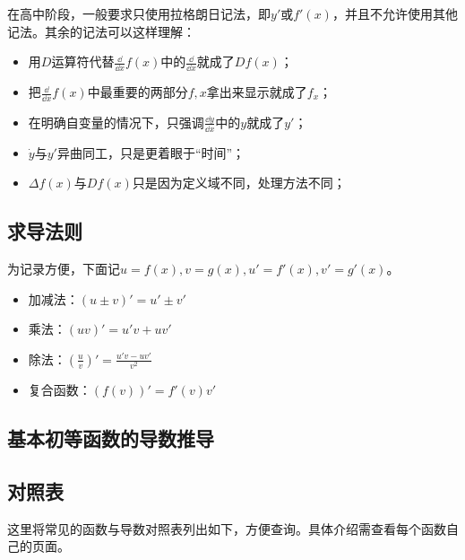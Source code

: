 在高中阶段，一般要求只使用拉格朗日记法，即$y'$或$f'(x)$，并且不允许使用其他记法。其余的记法可以这样理解：
\begin{itemize}
\item 用$D$运算符代替$\displaystyle\frac{\dd}{\dd x}f(x)$中的$\displaystyle\frac{\dd}{\dd x}$就成了$Df(x)$；
\item 把$\displaystyle\frac{\dd}{\dd x}f(x)$中最重要的两部分$f,x$拿出来显示就成了$f_x$；
\item 在明确自变量的情况下，只强调$\displaystyle\frac{\dd y}{\dd x}$中的$y$就成了$y'$；
\item $\dot{y}$与$y'$异曲同工，只是更着眼于“时间”；
\item $\Delta f(x)$与$Df(x)$只是因为定义域不同，处理方法不同；
\end{itemize}

\subsection{求导法则}

为记录方便，下面记$u=f(x),v=g(x),u'=f'(x),v'=g'(x)$。

\begin{itemize}
\item 加减法：$(u\pm v)'=u'\pm v'$
\item 乘法：$(uv)'=u'v+uv'$
\item 除法：$\displaystyle\left(\frac{u}{v}\right)'=\frac{u'v-uv'}{v^2}$
\item 复合函数：$(f(v))'=f'(v)v'$
\end{itemize}

\subsection{基本初等函数的导数推导}

\subsection{对照表}

这里将常见的函数与导数对照表列出如下，方便查询。具体介绍需查看每个函数自己的页面。

